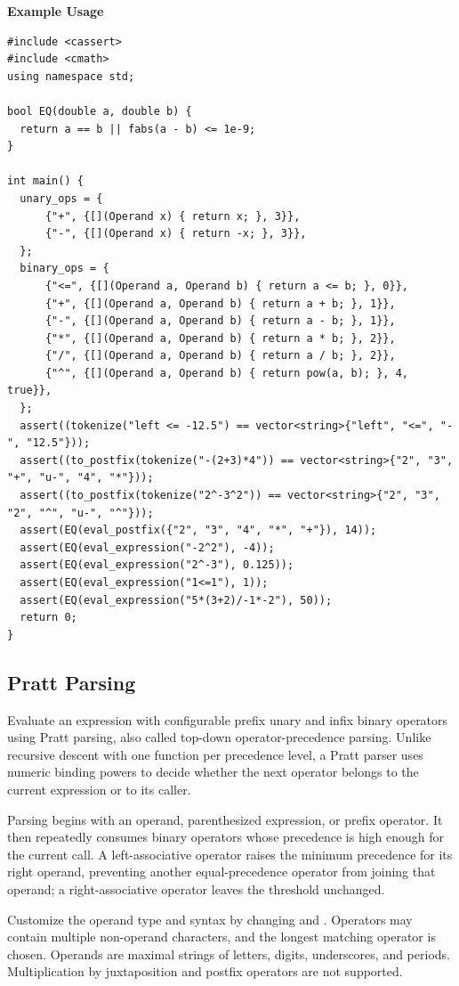 \textbf{Example Usage}\par
\begin{lstlisting}[style=cpp]
#include <cassert>
#include <cmath>
using namespace std;

bool EQ(double a, double b) {
  return a == b || fabs(a - b) <= 1e-9;
}

int main() {
  unary_ops = {
      {"+", {[](Operand x) { return x; }, 3}},
      {"-", {[](Operand x) { return -x; }, 3}},
  };
  binary_ops = {
      {"<=", {[](Operand a, Operand b) { return a <= b; }, 0}},
      {"+", {[](Operand a, Operand b) { return a + b; }, 1}},
      {"-", {[](Operand a, Operand b) { return a - b; }, 1}},
      {"*", {[](Operand a, Operand b) { return a * b; }, 2}},
      {"/", {[](Operand a, Operand b) { return a / b; }, 2}},
      {"^", {[](Operand a, Operand b) { return pow(a, b); }, 4, true}},
  };
  assert((tokenize("left <= -12.5") == vector<string>{"left", "<=", "-", "12.5"}));
  assert((to_postfix(tokenize("-(2+3)*4")) == vector<string>{"2", "3", "+", "u-", "4", "*"}));
  assert((to_postfix(tokenize("2^-3^2")) == vector<string>{"2", "3", "2", "^", "u-", "^"}));
  assert(EQ(eval_postfix({"2", "3", "4", "*", "+"}), 14));
  assert(EQ(eval_expression("-2^2"), -4));
  assert(EQ(eval_expression("2^-3"), 0.125));
  assert(EQ(eval_expression("1<=1"), 1));
  assert(EQ(eval_expression("5*(3+2)/-1*-2"), 50));
  return 0;
}
\end{lstlisting}
\subsection{Pratt Parsing}
\label{sec:3.7.3}
Evaluate an expression with configurable prefix unary and infix binary operators using Pratt parsing, also called top-down operator-precedence parsing. Unlike recursive descent with one function per precedence level, a Pratt parser uses numeric binding powers to decide whether the next operator belongs to the current expression or to its caller.

Parsing begins with an operand, parenthesized expression, or prefix operator. It then repeatedly consumes binary operators whose precedence is high enough for the current call. A left-associative operator raises the minimum precedence for its right operand, preventing another equal-precedence operator from joining that operand; a right-associative operator leaves the threshold unchanged.

Customize the operand type and syntax by changing  and . Operators may contain multiple non-operand characters, and the longest matching operator is chosen. Operands are maximal strings of letters, digits, underscores, and periods. Multiplication by juxtaposition and postfix operators are not supported.

